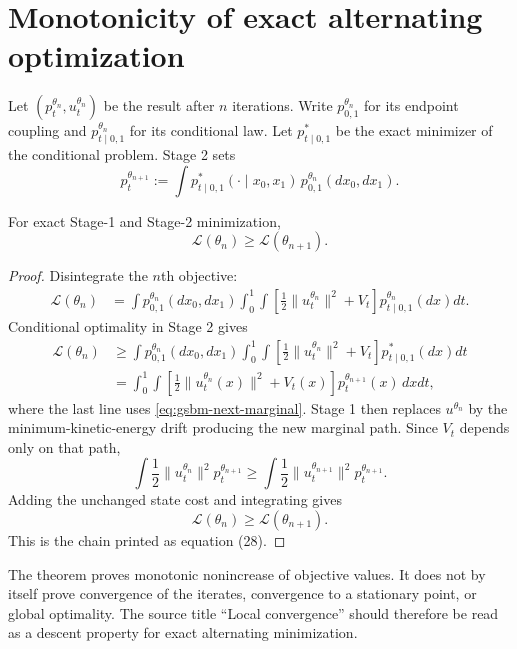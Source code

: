 \section{Monotonicity of exact alternating optimization}
Let $(p_t^{\theta_n},u_t^{\theta_n})$ be the result after $n$ iterations.  Write
$p_{0,1}^{\theta_n}$ for its endpoint coupling and
$p_{t\mid0,1}^{\theta_n}$ for its conditional law.  Let
$p_{t\mid0,1}^*$ be the exact minimizer of the conditional problem.  Stage 2
sets
\begin{equation}
  p_t^{\theta_{n+1}}
  :=\int p_{t\mid0,1}^*(\cdot\mid x_0,x_1)
  \,p_{0,1}^{\theta_n}(dx_0,dx_1).
  \tag{27}\label{eq:gsbm-next-marginal}
\end{equation}

\begin{theorem}
For exact Stage-1 and Stage-2 minimization,
\[
  \mathcal L(\theta_n)\ge\mathcal L(\theta_{n+1}).
\]
\end{theorem}

\begin{proof}
Disintegrate the $n$th objective:
\begin{align*}
  \mathcal L(\theta_n)
  &=\int p_{0,1}^{\theta_n}(dx_0,dx_1)
    \int_0^1\int
    \left[
      \frac12\|u_t^{\theta_n}\|^2+V_t
    \right]
    p_{t\mid0,1}^{\theta_n}(dx)dt.
\end{align*}
Conditional optimality in Stage 2 gives
\begin{align*}
  \mathcal L(\theta_n)
  &\ge\int p_{0,1}^{\theta_n}(dx_0,dx_1)
    \int_0^1\int
    \left[
      \frac12\|u_t^{\theta_n}\|^2+V_t
    \right]
    p_{t\mid0,1}^{*}(dx)dt\\
  &=\int_0^1\int
    \left[
      \frac12\|u_t^{\theta_n}(x)\|^2+V_t(x)
    \right]
    p_t^{\theta_{n+1}}(x)\,dxdt,
\end{align*}
where the last line uses \eqref{eq:gsbm-next-marginal}.  Stage 1 then replaces
$u^{\theta_n}$ by the minimum-kinetic-energy drift producing the new marginal
path.  Since $V_t$ depends only on that path,
\[
  \int\frac12\|u_t^{\theta_n}\|^2p_t^{\theta_{n+1}}
  \ge
  \int\frac12\|u_t^{\theta_{n+1}}\|^2p_t^{\theta_{n+1}}.
\]
Adding the unchanged state cost and integrating gives
\[
  \mathcal L(\theta_n)\ge\mathcal L(\theta_{n+1}).
\]
This is the chain printed as equation (28).
\end{proof}

\begin{remark}
The theorem proves monotonic nonincrease of objective values.  It does not by
itself prove convergence of the iterates, convergence to a stationary point,
or global optimality.  The source title ``Local convergence'' should therefore
be read as a descent property for exact alternating minimization.
\end{remark}

